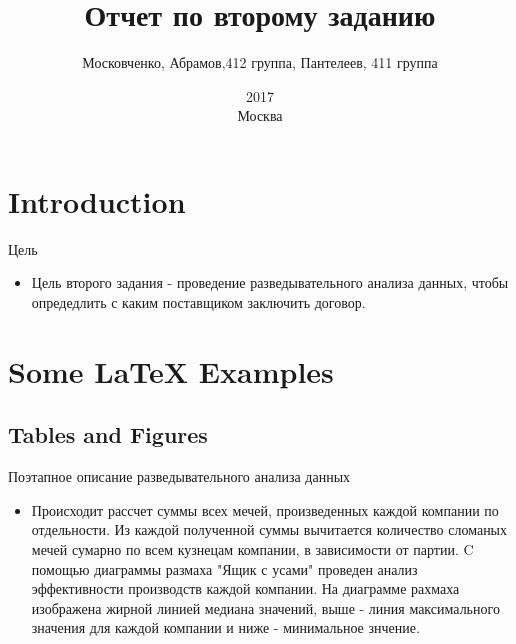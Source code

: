 \documentclass{beamer}
\title[Your Short Title]{Отчет по второму заданию}
\author{Московченко, Абрамов,412 группа, Пантелеев, 411 группа}
\institute{МГУ им М.В. Ломоносова, Москва, Россия}
\date{2017\\Москва}
\begin{document}
\begin{frame}
  \titlepage
\end{frame}


\section{Introduction}

\begin{frame}{Цель}

\begin{itemize}
  \item Цель второго задания - проведение разведывательного анализа данных, чтобы опредедлить с каким поставщиком заключить договор.
\end{itemize}

\vskip 1cm

\end{frame}

\section{Some \LaTeX{} Examples}

\subsection{Tables and Figures}

\begin{frame}{Поэтапное описание разведывательного анализа данных}

\begin{itemize}

\item Происходит рассчет суммы всех мечей, произведенных каждой компании по отдельности. Из каждой полученной суммы вычитается количество сломаных мечей сумарно по всем кузнецам компании, в зависимости от партии. 
C помощью диаграммы размаха "Ящик с усами" проведен анализ эффективности производств каждой компании.
На диаграмме рахмаха изображена жирной линией медиана значений, выше - линия максимального значения для каждой компании и ниже - минимальное знчение.

\end{itemize}

\end{frame}
\end{document}
